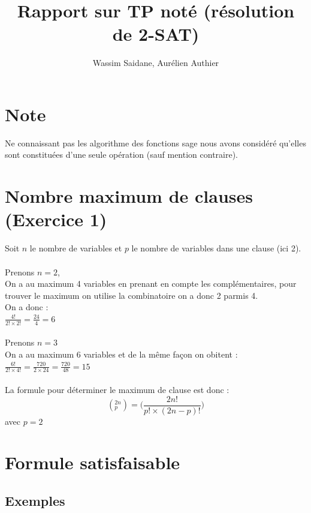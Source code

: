 \documentclass{article}
\title{Rapport sur TP noté (résolution de 2-SAT)}
\author{Wassim Saidane, Aurélien Authier}
\date{}
\begin{document}
    \maketitle
    \tableofcontents
    \newpage
    \section*{Note}
    Ne connaissant pas les algorithme des fonctions sage nous avons considéré qu'elles sont constituées d'une seule opération (sauf mention contraire).
    \section{Nombre maximum de clauses (Exercice 1)}
    Soit $n$ le nombre de variables et $p$ le nombre de variables dans une clause (ici 2). \\
    \\
    Prenons $n=2$, \\
    On a au maximum 4 variables en prenant en compte les complémentaires, pour trouver le maximum on utilise la combinatoire on a donc 2 parmis 4.\\
    On a donc : \\
    $\frac{4!}{2! \times 2!}=\frac{24}{4}=6$ \\
    \\
    Prenons $n=3$ \\
    On a au maximum 6 variables et de la même façon on obitent : \\
    $\frac{6!}{2! \times 4!}=\frac{720}{2 \times 24}=\frac{720}{48}=15$ \\
    \\
    La formule pour déterminer le maximum de clause est donc : 
    \begin{equation*}
        (^{2n}_p)=\biggl(\frac{2n!}{p! \times (2n-p)!}\biggr)
    \end{equation*}
    avec $p=2$
    \section{Formule satisfaisable}
    \subsection{Exemples}
\end{document}
